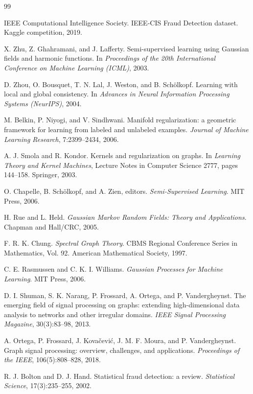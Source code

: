 \documentclass[11pt]{article}
\theoremstyle{definition}
\theoremstyle{remark}
\begin{document}
\begin{thebibliography}{99}

IEEE Computational Intelligence Society.
IEEE-CIS Fraud Detection dataset. Kaggle competition, 2019.

X. Zhu, Z. Ghahramani, and J. Lafferty.
Semi-supervised learning using Gaussian fields and harmonic functions.
In \emph{Proceedings of the 20th International Conference on Machine Learning (ICML)}, 2003.

D. Zhou, O. Bousquet, T. N. Lal, J. Weston, and B. Schölkopf.
Learning with local and global consistency.
In \emph{Advances in Neural Information Processing Systems (NeurIPS)}, 2004.

M. Belkin, P. Niyogi, and V. Sindhwani.
Manifold regularization: a geometric framework for learning from labeled and unlabeled examples.
\emph{Journal of Machine Learning Research}, 7:2399--2434, 2006.

A. J. Smola and R. Kondor.
Kernels and regularization on graphs.
In \emph{Learning Theory and Kernel Machines}, Lecture Notes in Computer Science 2777, pages 144--158. Springer, 2003.

O. Chapelle, B. Schölkopf, and A. Zien, editors.
\emph{Semi-Supervised Learning}.
MIT Press, 2006.

H. Rue and L. Held.
\emph{Gaussian Markov Random Fields: Theory and Applications}.
Chapman and Hall/CRC, 2005.

F. R. K. Chung.
\emph{Spectral Graph Theory}.
CBMS Regional Conference Series in Mathematics, Vol. 92. American Mathematical Society, 1997.

C. E. Rasmussen and C. K. I. Williams.
\emph{Gaussian Processes for Machine Learning}.
MIT Press, 2006.

D. I. Shuman, S. K. Narang, P. Frossard, A. Ortega, and P. Vandergheynst.
The emerging field of signal processing on graphs: extending high-dimensional data analysis to networks and other irregular domains.
\emph{IEEE Signal Processing Magazine}, 30(3):83--98, 2013.

A. Ortega, P. Frossard, J. Kovačević, J. M. F. Moura, and P. Vandergheynst.
Graph signal processing: overview, challenges, and applications.
\emph{Proceedings of the IEEE}, 106(5):808--828, 2018.

R. J. Bolton and D. J. Hand.
Statistical fraud detection: a review.
\emph{Statistical Science}, 17(3):235--255, 2002.


\end{thebibliography}
\end{document}
